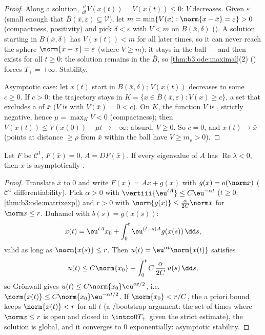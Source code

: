 \begin{proof}
Along a solution, $\frac{\dd}{\dd t}V(x(t)) = \dot V(x(t))
\leq 0$: $V$ decreases. Given $\varepsilon$ (small enough
that $\bar B(\bar x, \varepsilon) \subseteq \mathcal V$), let
$m = \min\{V(x) : \norm{x - \bar x} = \varepsilon\} > 0$
(compactness, positivity) and pick $\delta < \varepsilon$
with $V < m$ on $B(\bar x, \delta)$ (). A solution
starting in $B(\bar x, \delta)$ has $V(x(t)) < m$ for all
later times, so it can never reach the sphere $\norm{x -
\bar x} = \varepsilon$ (where $V \geq m$): it stays in the
ball --- and then exists for all $t \geq 0$: the solution
remains in the  $\bar B$, so
\cref{thm:b3:ode:maximal}(2) () forces
$T_+ = +\infty$. Stability.

Asymptotic case: let $x(t)$ start in $B(\bar x, \delta)$;
$V(x(t))$ decreases to some $c \geq 0$. If $c > 0$: the
trajectory stays in $K = \{x \in \bar B(\bar x,
\varepsilon): V(x) \geq c\}$, a  set that excludes a
 of $\bar x$ ($V$ is  with $V(\bar x)
= 0 < c$). On $K$, the function $\dot V$ is ,
strictly negative, hence $\mu = \max_K\dot V < 0$
(compactness); then $V(x(t)) \leq V(x(0)) + \mu t \to
-\infty$: absurd, $V \geq 0$. So
$c = 0$, and $x(t) \to \bar x$ (points at distance $\geq
\rho$ from $\bar x$ within the ball have $V \geq m_\rho >
0$).
\end{proof}

\begin{theorem}
\label{thm:b3:ode:linearization}
Let $F$ be $\mathcal C^1$, $F(\bar x) = 0$, $A = DF(\bar x)$.
If every eigenvalue of $A$ has $\operatorname{Re}\lambda <
0$, then $\bar x$ is asymptotically .
\end{theorem}

\begin{proof}
Translate $\bar x$ to $0$ and write $F(x) = Ax + g(x)$ with
$g(x) = o(\norm x)$ ($\mathcal C^1$ differentiability). Pick
$\alpha > 0$ with $\vertiii{\eu^{tA}} \leq C\eu^{-\alpha t}$
($t \geq 0$; \cref{thm:b3:ode:matrixexp}) and $r > 0$ with
$\norm{g(x)} \leq \frac{\alpha}{2C}\norm x$ for $\norm x \leq
r$. Duhamel with $b(s) = g(x(s))$:
\[
x(t) = \eu^{tA}x_0 + \int_0^t\eu^{(t-s)A}g(x(s))\,\dd s,
\]
valid as long as $\norm{x(s)} \leq r$. Then $u(t) =
\eu^{\alpha t}\norm{x(t)}$ satisfies
\[
u(t) \leq C\norm{x_0} +
\int_0^{t}C\,\frac{\alpha}{2C}\,u(s)\,\dd s ,
\]
so Gr\"onwall gives $u(t) \leq C\norm{x_0}\eu^{\alpha t/2}$,
i.e.\ $\norm{x(t)} \leq C\norm{x_0}\eu^{-\alpha t/2}$. If
$\norm{x_0} < r/C$, the a priori bound keeps $\norm{x(t)} <
r$ for all $t$ (a /bootstrap argument: the set of
times where $\norm x \leq r$ is open and closed in
$\intco0{T_+}$ given the strict estimate), the solution is
global, and it converges to $0$ exponentially: asymptotic
stability.
\end{proof}

